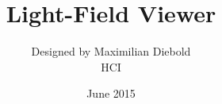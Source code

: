 \documentclass[12pt,a4paper,twoside,openright]{article}
\begin{document}
\title{Light-Field Viewer}
\author{Designed by Maximilian Diebold\\ HCI }
\date{June 2015}
\maketitle


\newpage


\end{document}

